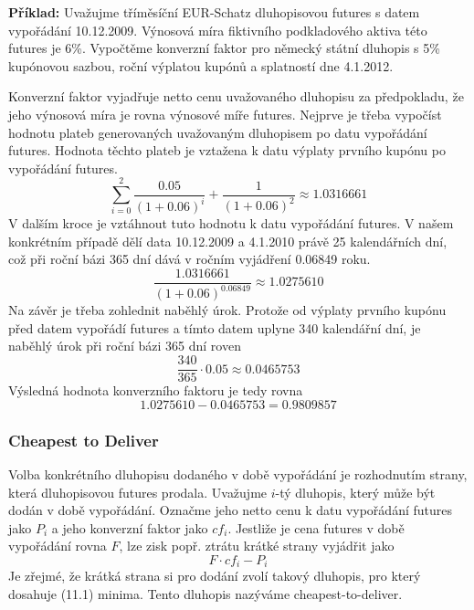 \documentclass[a4paper]{book}
\begin{document}
\noindent \textbf{Příklad:} Uvažujme tříměsíční EUR-Schatz dluhopisovou futures s datem vypořádání 10.12.2009. Výnosová míra fiktivního podkladového aktiva této futures je 6\%. Vypočtěme konverzní faktor pro německý státní dluhopis s 5\% kupónovou sazbou, roční výplatou kupónů a splatností dne 4.1.2012.

Konverzní faktor vyjadřuje netto cenu uvažovaného dluhopisu za předpokladu, že jeho výnosová míra je rovna výnosové míře futures. Nejprve je třeba vypočíst hodnotu plateb generovaných uvažovaným dluhopisem po datu vypořádání futures. Hodnota těchto plateb je vztažena k datu výplaty prvního kupónu po vypořádání futures.
\begin{equation*}
\sum_{i=0}^2 \frac{0.05}{(1 + 0.06)^i} + \frac{1}{(1 + 0.06)^2} \approx 1.0316661
\end{equation*}
V dalším kroce je vztáhnout tuto hodnotu k datu vypořádání futures. V našem konkrétním případě dělí data 10.12.2009 a 4.1.2010 právě 25 kalendářních dní, což při roční bázi 365 dní dává v ročním vyjádření 0.06849 roku.
\begin{equation*}
\frac{1.0316661}{(1 + 0.06)^{0.06849}} \approx 1.0275610
\end{equation*}
Na závěr je třeba zohlednit naběhlý úrok. Protože od výplaty prvního kupónu před datem vypořádí futures a tímto datem uplyne 340 kalendářní dní, je naběhlý úrok při roční bázi 365 dní roven
\begin{equation*}
\frac{340}{365} \cdot 0.05 \approx 0.0465753
\end{equation*}
Výsledná hodnota konverzního faktoru je tedy rovna
\begin{equation*}
1.0275610 - 0.0465753 = 0.9809857
\end{equation*}

\subsubsection{Cheapest to Deliver}

Volba konkrétního dluhopisu dodaného v době vypořádání je rozhodnutím strany, která dluhopisovou futures prodala. Uvažujme $i$-tý dluhopis, který může být dodán v době vypořádání. Označme jeho netto cenu k datu vypořádání futures jako $P_i$ a jeho konverzní faktor jako $cf_i$. Jestliže je cena futures v době vypořádání rovna $F$, lze zisk popř. ztrátu krátké strany vyjádřit jako
\begin{equation}
F \cdot cf_i - P_i
\end{equation}
Je zřejmé, že krátká strana si pro dodání zvolí takový dluhopis, pro který dosahuje (11.1) minima. Tento dluhopis nazýváme cheapest-to-deliver.
\end{document}

